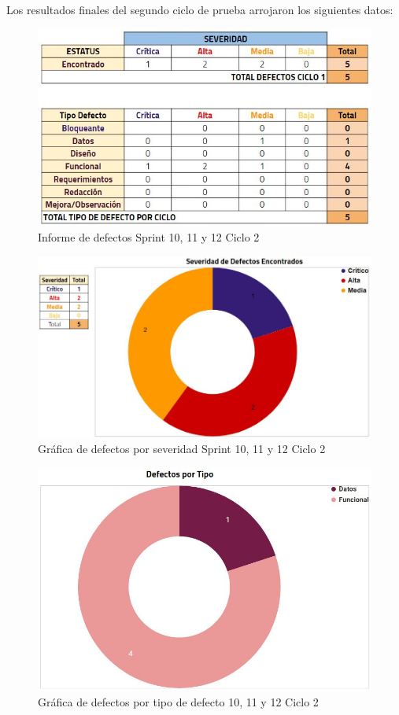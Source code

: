 Los resultados finales del segundo ciclo de prueba arrojaron los siguientes datos:

\begin{figure}[H]
	\begin{center}
		\includegraphics[width=.95\textwidth]{images/pruebas/s10c2}
		\caption{Informe de defectos Sprint 10, 11 y 12  Ciclo 2}
		\label{fig:infos10c2}
	\end{center}
\end{figure}

\begin{figure}[H]
	\begin{center}
		\includegraphics[width=.85\textwidth]{images/pruebas/s10c2-1}
		\caption{Gráfica de defectos por severidad Sprint 10, 11 y 12  Ciclo 2}
		\label{fig:infos10c2-1}
	\end{center}
\end{figure}

\begin{figure}[H]
	\begin{center}
		\includegraphics[width=.75\textwidth]{images/pruebas/s10c2-2}
		\caption{Gráfica de defectos por tipo de defecto 10, 11 y 12  Ciclo 2}
		\label{fig:infos10c2-2}
	\end{center}
\end{figure}